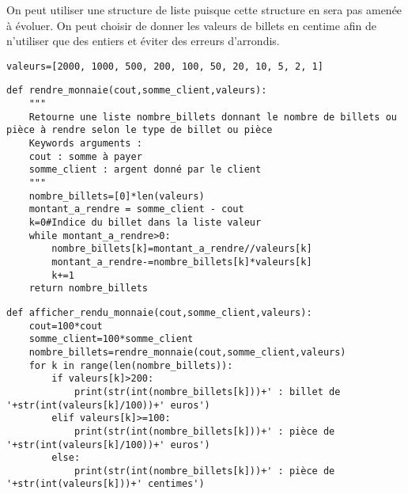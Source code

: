 \question{}
On peut utiliser une structure de liste puisque cette structure en sera pas amenée à évoluer. On peut choisir de donner les valeurs de billets en centime afin de n'utiliser que des entiers et éviter des erreurs d'arrondis.
\begin{lstlisting}
valeurs=[2000, 1000, 500, 200, 100, 50, 20, 10, 5, 2, 1]
\end{lstlisting}

\question{}

\begin{lstlisting}
def rendre_monnaie(cout,somme_client,valeurs):
    """
    Retourne une liste nombre_billets donnant le nombre de billets ou pièce à rendre selon le type de billet ou pièce
    Keywords arguments :
    cout : somme à payer
    somme_client : argent donné par le client
    """
    nombre_billets=[0]*len(valeurs)
    montant_a_rendre = somme_client - cout
    k=0#Indice du billet dans la liste valeur
    while montant_a_rendre>0:
        nombre_billets[k]=montant_a_rendre//valeurs[k]
        montant_a_rendre-=nombre_billets[k]*valeurs[k]
        k+=1
    return nombre_billets
\end{lstlisting}

\question{}

\begin{lstlisting}
def afficher_rendu_monnaie(cout,somme_client,valeurs):
    cout=100*cout
    somme_client=100*somme_client
    nombre_billets=rendre_monnaie(cout,somme_client,valeurs)
    for k in range(len(nombre_billets)):
        if valeurs[k]>200:
            print(str(int(nombre_billets[k]))+' : billet de '+str(int(valeurs[k]/100))+' euros')
        elif valeurs[k]>=100:
            print(str(int(nombre_billets[k]))+' : pièce de '+str(int(valeurs[k]/100))+' euros')
        else:
            print(str(int(nombre_billets[k]))+' : pièce de '+str(int(valeurs[k]))+' centimes')
\end{lstlisting}